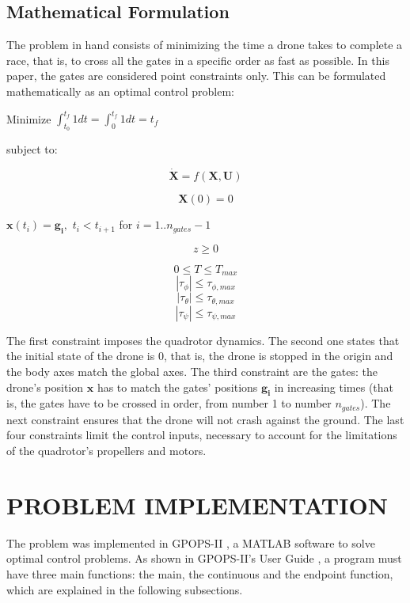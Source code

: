 \documentclass[letterpaper, 10 pt, conference]{ieeeconf}  %
\begin{document}
\subsection{Mathematical Formulation}\label{subs:math_form}
The problem in hand consists of minimizing the time a drone takes to complete a race, that is, to cross all the gates in a specific order as fast as possible. In this paper, the gates are considered point constraints only. This can be formulated mathematically as an optimal control problem:

\bigskip

Minimize \quad $\int_{t_0}^{t_f} 1 dt = \int_{0}^{t_f} 1 dt = t_f$

\bigskip

subject to:

$$ \bm{\dot{X}} = f(\boldsymbol{X}, \boldsymbol{U}) $$

$$ \bm{X}(0) = 0 $$

\quad $ \bm{x}(t_i) = \bm{g_i},$ \quad $t_i < t_{i+1} $ for $i = 1 .. n_{gates}-1$

$$ z \ge 0 $$

$$ 0 \le T \le T_{max} $$
$$  |\tau_{\phi}| \le \tau_{\phi,max} $$
$$  |\tau_{\theta}| \le \tau_{\theta,max} $$
$$  |\tau_{\psi}| \le \tau_{\psi,max} $$

The first constraint imposes the quadrotor dynamics. The second one states that the initial state of the drone is 0, that is, the drone is stopped in the origin and the body axes match the global axes. The third constraint are the gates: the drone's position $\bm{x}$ has to match the gates' positions $\bm{g_i}$ in increasing times (that is, the gates have to be crossed in order, from number 1 to number $n_{gates}$). The next constraint ensures that the drone will not crash against the ground. The last four constraints limit the control inputs, necessary to account for the limitations of the quadrotor's propellers and motors.

\section{PROBLEM IMPLEMENTATION}\label{s:impl}

The problem was implemented in GPOPS-II \cite{patterson2014gpops}, a MATLAB software to solve optimal control problems. As shown in GPOPS-II's User Guide \cite{gpops_guide}, a program must have three main functions: the main, the continuous and the endpoint function, which are explained in the following subsections.
\end{document}
